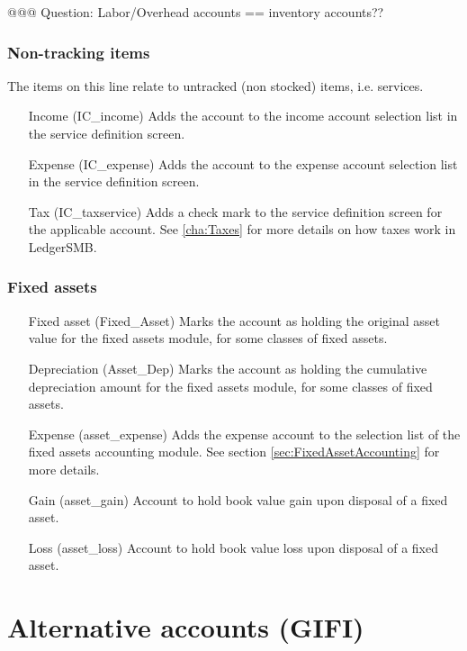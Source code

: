 \documentclass[10pt,A4]{book}
\begin{document}
@@@ Question: Labor/Overhead accounts == inventory accounts??

\subsubsection{Non-tracking items}

The items on this line relate to untracked (non stocked) items, i.e. services.

\begin{enumerate}
\item[Income (IC\_income)] Adds the account to the income account selection list in
   the service definition screen.
\item[Expense (IC\_expense)] Adds the account to the expense account selection list in
   the service definition screen.
\item[Tax (IC\_taxservice)] Adds a check mark to the service definition screen for the
   applicable account. See \ref{cha:Taxes} for more details on how taxes work in LedgerSMB.
\end{enumerate}

\subsubsection{Fixed assets}

\begin{enumerate}
\item[Fixed asset (Fixed\_Asset)] Marks the account as holding the original asset value for the fixed
   assets module, for some classes of fixed assets.
\item[Depreciation (Asset\_Dep)] Marks the account as holding the cumulative depreciation amount
   for the fixed assets module, for some classes of fixed assets.
\item[Expense (asset\_expense)] Adds the expense account to the selection list of the fixed assets
   accounting module. See section \ref{sec:FixedAssetAccounting} for more details.
\item[Gain (asset\_gain)] Account to hold book value gain upon disposal of a fixed asset.
\item[Loss (asset\_loss)] Account to hold book value loss upon disposal of a fixed asset.
\end{enumerate}


\section{Alternative accounts (GIFI)}
\end{document}

